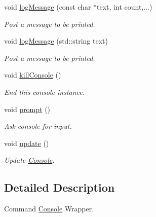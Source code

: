 \begin{DoxyCompactItemize}
void \mbox{\hyperlink{class_console_aa003eda272ee1a7fd9ca2431540871c3}{log\+Message}} (const char $\ast$text, int count,...)
\begin{DoxyCompactList}\small\item\em Post a message to be printed. \end{DoxyCompactList}\item 
\mbox{\label{class_console_a1464236e7a4e372394757b4c71cfffa3}} 
void \mbox{\hyperlink{class_console_a1464236e7a4e372394757b4c71cfffa3}{log\+Message}} (std\+::string text)
\begin{DoxyCompactList}\small\item\em Post a message to be printed. \end{DoxyCompactList}\item 
\mbox{\label{class_console_a77b606313ab488631efcf145f2d889e6}} 
void \mbox{\hyperlink{class_console_a77b606313ab488631efcf145f2d889e6}{kill\+Console}} ()
\begin{DoxyCompactList}\small\item\em End this console instance. \end{DoxyCompactList}\item 
\mbox{\label{class_console_a6316a11484f3cc1d392d9bbdab8533b4}} 
void \mbox{\hyperlink{class_console_a6316a11484f3cc1d392d9bbdab8533b4}{prompt}} ()
\begin{DoxyCompactList}\small\item\em Ask console for input. \end{DoxyCompactList}\item 
\mbox{\label{class_console_af1d3a54bd8649b46574ad35998563fea}} 
void \mbox{\hyperlink{class_console_af1d3a54bd8649b46574ad35998563fea}{update}} ()
\begin{DoxyCompactList}\small\item\em Update \mbox{\hyperlink{class_console}{Console}}. \end{DoxyCompactList}\end{DoxyCompactItemize}


\subsection{Detailed Description}
Command \mbox{\hyperlink{class_console}{Console}} Wrapper. 

